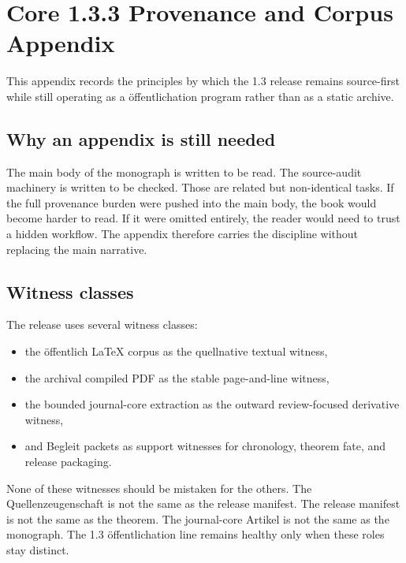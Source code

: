 \section{Core 1.3.3 Provenance and Corpus Appendix}

This appendix records the principles by which the 1.3 release remains source-first while still
operating as a öffentlichation program rather than as a static archive.

\subsection{Why an appendix is still needed}

The main body of the monograph is written to be read.
The source-audit machinery is written to be checked.
Those are related but non-identical tasks.
If the full provenance burden were pushed into the main body, the book would become harder to read.
If it were omitted entirely, the reader would need to trust a hidden workflow.
The appendix therefore carries the discipline without replacing the main narrative.

\subsection{Witness classes}

The release uses several witness classes:

\begin{itemize}
\item the öffentlich LaTeX corpus as the quellnative textual witness,
\item the archival compiled PDF as the stable page-and-line witness,
\item the bounded journal-core extraction as the outward review-focused derivative witness,
\item and Begleit packets as support witnesses for chronology, theorem fate, and release
      packaging.
\end{itemize}

None of these witnesses should be mistaken for the others.
The Quellenzeugenschaft is not the same as the release manifest.
The release manifest is not the same as the theorem.
The journal-core Artikel is not the same as the monograph.
The 1.3 öffentlichation line remains healthy only when these roles stay distinct.

